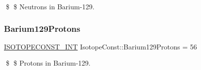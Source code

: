 \$ \$ Neutrons in Barium-\/129. \mbox{\label{group___isotope_const-_barium-_ba129_ga4210bcb2ff4aa901527f578d4b51129a}} 
\subsubsection{\texorpdfstring{Barium129\+Protons}{Barium129Protons}}
{\footnotesize\ttfamily \mbox{\hyperlink{group___isotope_const-_macros_ga5f18360b3e99483a35c32d789e62621c}{I\+S\+O\+T\+O\+P\+E\+C\+O\+N\+S\+T\+\_\+\+I\+NT}} Isotope\+Const\+::\+Barium129\+Protons = 56}

\$ \$ Protons in Barium-\/129. 